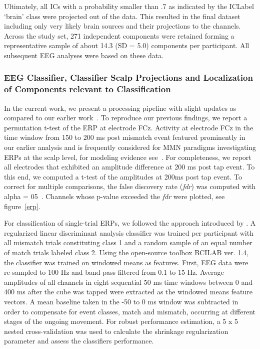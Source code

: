Ultimately, all ICs with a probability smaller than .7 as indicated by the ICLabel `brain' class were projected out of the data. This resulted in the final dataset including only very likely brain sources and their projections to the channels. Across the study set, 271 independent components were retained forming a representative sample of about 14.3 (SD = 5.0) components per participant. All subsequent EEG analyses were based on these data.

\subsubsection{EEG Classifier, Classifier Scalp Projections and Localization of Components relevant to Classification}

In the current work, we present a processing pipeline with slight updates as compared to our earlier work~\cite{Gehrke2019-og}. To reproduce our previous findings, we report a permutation t-test of the ERP at electrode FCz. Activity at electrode FCz in the time window from 150 to 200 ms post mismatch event featured prominently in our earlier analysis and is frequently considered for MMN paradigms investigating ERPs at the scalp level, for modeling evidence see~\cite{Lieder2013-dl, Lieder2013-os}. For completeness, we report all electrodes that exhibited an amplitude difference at 200 ms post tap event. To this end, we computed a t-test of the amplitudes at 200ms post tap event. To correct for multiple comparisons, the false discovery rate (\textit{fdr}) was computed with alpha = 05~\cite{Benjamini1995-cw}. Channels whose p-value exceeded the \textit{fdr} were plotted, see figure~\ref{erp}.

For classification of single-trial ERPs, we followed the approach introduced by \cite{Zander2016-ed}. A regularized linear discriminant analysis classifier was trained per participant with all mismatch trials constituting class 1 and a random sample of an equal number of match trials labeled class 2. Using the open-source toolbox BCILAB ver. 1.4, the classifier was trained on windowed means as features. First, EEG data were re-sampled to 100 Hz and band-pass filtered from 0.1 to 15 Hz. Average amplitudes of all channels in eight sequential 50 ms time windows between 0 and 400 ms after the cube was tapped were extracted as the windowed means feature vectors. A mean baseline taken in the -50 to 0 ms window was subtracted in order to compensate for event classes, match and mismatch, occurring at different stages of the ongoing movement. For robust performance estimation, a 5 x 5 nested cross-validation was used to calculate the shrinkage regularization parameter and assess the classifiers performance.

